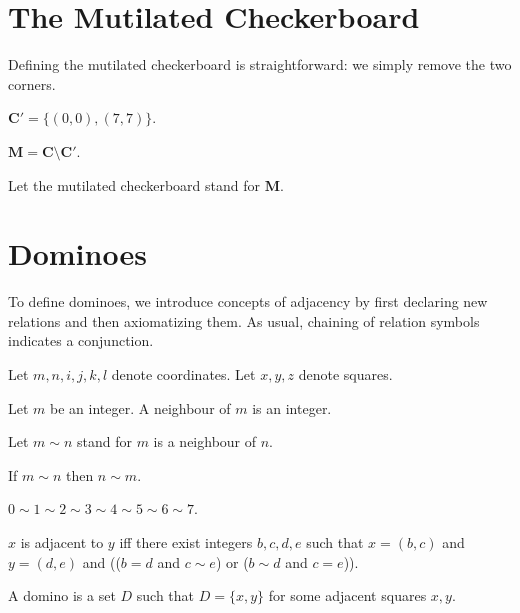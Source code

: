 \documentclass[english]{article}
\newcommand{\Checkerboard}{\mathbf{C}}
\newcommand{\Corners}{\mathbf{C'}}
\newcommand{\Mutilated}{\mathbf{M}}
\begin{document}
\section{The Mutilated Checkerboard}

Defining the mutilated checkerboard is straightforward:
we simply remove the two corners.

\begin{forthel}
    \begin{definition}
        $\Corners = \{ (0, 0), (7, 7) \}$.
    \end{definition}

    \begin{definition}
        $\Mutilated = \Checkerboard \setminus \Corners$.
    \end{definition}

    Let the mutilated checkerboard stand for $\Mutilated$.
\end{forthel}



\section{Dominoes}

To define dominoes,
we introduce concepts of adjacency by first declaring new relations and then axiomatizing them.
As usual, chaining of relation symbols indicates a conjunction.

\begin{forthel}
    Let $m, n, i, j, k, l$ denote coordinates.
    Let $x, y, z$ denote squares.

    \begin{signature}
        Let $m$ be an integer. A neighbour of $m$ is an integer.
    \end{signature}
    Let $m\sim n$ stand for $m$ is a neighbour of $n$.

    \begin{axiom}
        If $m\sim n$ then $n\sim m$.
    \end{axiom}
    \begin{axiom}
        $0\sim 1\sim 2\sim 3\sim 4\sim 5\sim 6\sim 7$.
    \end{axiom}

    \begin{definition}
        $x$ is adjacent to $y$ iff
        there exist integers $b, c, d, e$ such that
        $x = (b, c)$ and $y = (d, e)$ and
        (($b = d$  and $c\sim e$) or
        ($b\sim d$ and $c = e$)).
    \end{definition}

    \begin{definition}
        A domino is a set $D$ such that $D = \{x, y\}$ for some
        adjacent squares $x, y$.
    \end{definition}
\end{forthel}
\end{document}
